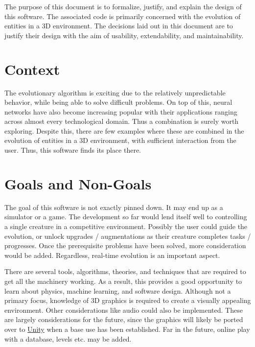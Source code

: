 \documentclass[../../main.tex]{subfiles}
\begin{document}
The purpose of this document is to formalize, justify, and explain the design of this software. The associated code is primarily concerned with the evolution of entities in a 3D environment. The decisions laid out in this document are to justify their design with the aim of usability, extendability, and maintainability.


\section{Context}
	The evolutionary algorithm is exciting due to the relatively unpredictable behavior, while being able to solve difficult problems. On top of this, neural networks have also become increasing popular with their applications ranging across almost every technological domain. Thus a combination is surely worth exploring. Despite this, there are few examples where these are combined in the evolution of entities in a 3D environment, with sufficient interaction from the user. Thus, this software finds its place there.


\section{Goals and Non-Goals}
	The goal of this software is not exactly pinned down. It may end up as a simulator or a game. The development so far would lend itself well to controlling a single creature in a competitive environment. Possibly the user could guide the evolution, or unlock upgrades / augmentations as their creature completes tasks / progresses. Once the prerequisite problems have been solved, more consideration would be added. Regardless, real-time evolution is an important aspect.

	There are several tools, algorithms, theories, and techniques that are required to get all the machinery working. As a result, this provides a good opportunity to learn about physics, machine learning, and software design. Although not a primary focus, knowledge of 3D graphics is required to create a visually appealing environment. Other considerations like audio could also be implemented. These are largely considerations for the future, since the graphics will likely be ported over to \href{https://unity.com/}{Unity} when  a base use has been established. Far in the future, online play with a database, levels etc. may be added.
\end{document}
